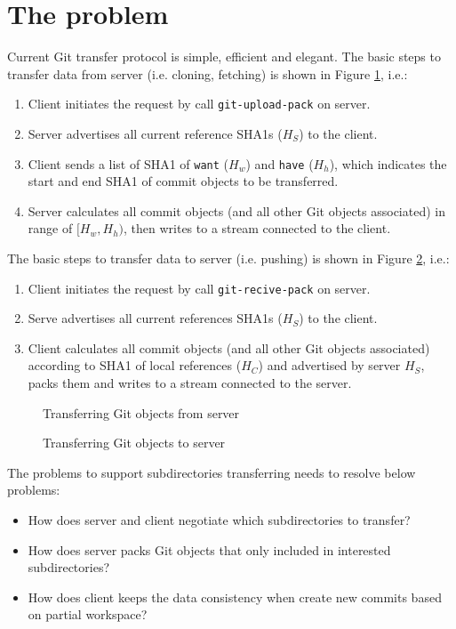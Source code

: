 \documentclass[preprint]{sigplanconf}
\begin{document}
\section{The problem}
Current Git transfer protocol is simple, efficient and elegant.
The basic steps to transfer data from server (i.e. cloning, fetching) is shown in Figure \ref{fig:git-proto-clone-seq}, i.e.:

\begin{enumerate}
  \item Client initiates the request by call \verb|git-upload-pack| on server.
  \item Server advertises all current reference SHA1s ($H_S$) to the client.
  \item Client sends a list of SHA1 of \verb|want| ($H_w$) and \verb|have| ($H_h$), which indicates the start and end SHA1 of commit objects to be transferred.
  \item Server calculates all commit objects (and all other Git objects associated) in range of $[H_w, H_h)$, then writes to a stream connected to the client.
\end{enumerate}

The basic steps to transfer data to server (i.e. pushing) is shown in Figure \ref{fig:git-proto-push-seq}, i.e.:
\begin{enumerate}
  \item Client initiates the request by call \verb|git-recive-pack| on server.
  \item Serve advertises all current references SHA1s ($H_S$) to the client.
  \item Client calculates all commit objects (and all other Git objects associated) according to SHA1 of local references ($H_C$) and advertised by server $H_S$, packs them and writes to a stream connected to the server.
\end{enumerate}

\begin{figure}
  \centering
  
  \caption{Transferring Git objects from server}
  \label{fig:git-proto-clone-seq}
\end{figure}

\begin{figure}
  \centering
  
  \caption{Transferring Git objects to server}
  \label{fig:git-proto-push-seq}
\end{figure}

The problems to support subdirectories transferring needs to resolve below problems:
\begin{itemize}
  \item How does server and client negotiate which subdirectories to transfer?
  \item How does server packs Git objects that only included in interested subdirectories?
  \item How does client keeps the data consistency when create new commits based on partial workspace?
\end{itemize}
\end{document}
